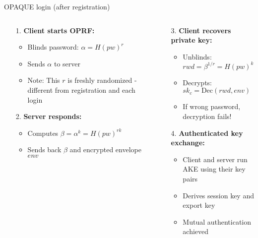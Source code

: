 \documentclass[aspectratio=169, lualatex, handout]{beamer}
\begin{document}
\begin{frame}{OPAQUE login (after registration)}
	\begin{columns}[c]
		\begin{column}{0.5\textwidth}
			\begin{itemize}
				\item[1.]\textbf{Client starts OPRF:}
				      \begin{itemize}
					      \item Blinds password: $\alpha = H(pw)^r$
					      \item Sends $\alpha$ to server
					      \item Note: This $r$ is freshly randomized - different from registration and each login
				      \end{itemize}
				\item[2.]\textbf{Server responds:}
				      \begin{itemize}
					      \item Computes $\beta = \alpha^k = H(pw)^{rk}$
					      \item Sends back $\beta$ and encrypted envelope $env$
				      \end{itemize}
			\end{itemize}
		\end{column}
		\begin{column}{0.5\textwidth}
			\begin{itemize}
				\item[3.]\textbf{Client recovers private key:}
				      \begin{itemize}
					      \item Unblinds: $rwd = \beta^{1/r} = H(pw)^k$
					      \item Decrypts: $sk_c = \text{Dec}(rwd, env)$
					      \item If wrong password, decryption fails!
				      \end{itemize}
				\item[4.]\textbf{Authenticated key exchange:}
				      \begin{itemize}
					      \item Client and server run AKE using their key pairs
					      \item Derives session key and export key
					      \item Mutual authentication achieved
				      \end{itemize}
			\end{itemize}
		\end{column}
	\end{columns}
\end{frame}
\end{document}
